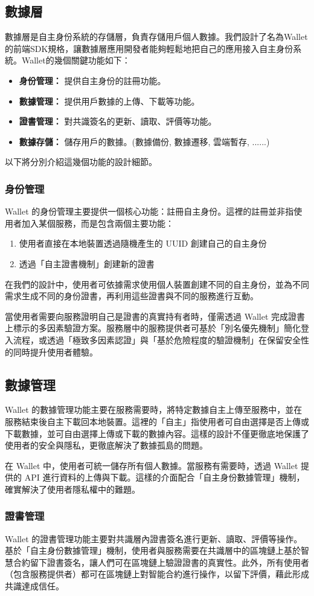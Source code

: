 \subsection{數據層}
數據層是自主身份系統的存儲層，負責存儲用戶個人數據。我們設計了名為Wallet的前端SDK規格，讓數據層應用開發者能夠輕鬆地把自己的應用接入自主身份系統。Wallet的幾個關鍵功能如下：
\begin{itemize}
  \item \textbf{身份管理：} 提供自主身份的註冊功能。
  \item \textbf{數據管理：} 提供用戶數據的上傳、下載等功能。
  \item \textbf{證書管理：} 對共識簽名的更新、讀取、評價等功能。
  \item \textbf{數據存儲：} 儲存用戶的數據。(數據備份, 數據遷移, 雲端暫存, ......)
\end{itemize}
以下將分別介紹這幾個功能的設計細節。
\subsubsection{身份管理}
Wallet 的身份管理主要提供一個核心功能：註冊自主身份。這裡的註冊並非指使用者加入某個服務，而是包含兩個主要功能：
\begin{enumerate}
  \item 使用者直接在本地裝置透過隨機產生的 UUID 創建自己的自主身份
  \item 透過「自主證書機制」創建新的證書
\end{enumerate}
在我們的設計中，使用者可依據需求使用個人裝置創建不同的自主身份，並為不同需求生成不同的身份證書，再利用這些證書與不同的服務進行互動。

當使用者需要向服務證明自己是證書的真實持有者時，僅需透過 Wallet 完成證書上標示的多因素驗證方案。服務層中的服務提供者可基於「別名優先機制」簡化登入流程，或透過「極致多因素認證」與「基於危險程度的驗證機制」在保留安全性的同時提升使用者體驗。
\subsection{數據管理}
Wallet 的數據管理功能主要在服務需要時，將特定數據自主上傳至服務中，並在服務結束後自主下載回本地裝置。這裡的「自主」指使用者可自由選擇是否上傳或下載數據，並可自由選擇上傳或下載的數據內容。這樣的設計不僅更徹底地保護了使用者的安全與隱私，更徹底解決了數據孤島的問題。

在 Wallet 中，使用者可統一儲存所有個人數據。當服務有需要時，透過 Wallet 提供的 API 進行資料的上傳與下載。這樣的介面配合「自主身份數據管理」機制，確實解決了使用者隱私權中的難題。
\subsubsection{證書管理}
Wallet 的證書管理功能主要對共識層內證書簽名進行更新、讀取、評價等操作。基於「自主身份數據管理」機制，使用者與服務需要在共識層中的區塊鏈上基於智慧合約留下證書簽名，讓人們可在區塊鏈上驗證證書的真實性。此外，所有使用者（包含服務提供者）都可在區塊鏈上對智能合約進行操作，以留下評價，藉此形成共識達成信任。

